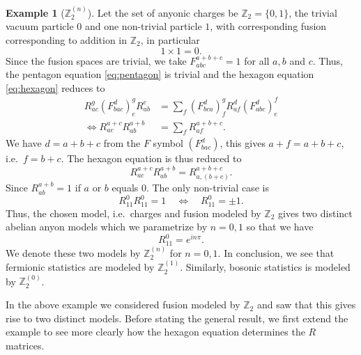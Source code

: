 \documentclass[a4paper,10pt,oneside]{book}
\theoremstyle{plain}
\theoremstyle{definition}
\newtheorem{example}{Example}[section]
\theoremstyle{remark}
\begin{document}
\begin{example}[$\mathbb{Z}_2^{(n)}$]
  Let the set of anyonic charges be $\mathbb{Z}_2 = \{0, 1\}$, the trivial vacuum particle $0$ and one non-trivial particle $1$, with corresponding fusion corresponding to addition in $\mathbb{Z}_2$, in particular
  \begin{equation}
    1 × 1 = 0.
  \end{equation}
  Since the fusion spaces are trivial, we take $F_{abc}^{a+b+c} = 1$ for all $a, b$ and $c$. Thus, the pentagon equation \cref{eq:pentagon} is trivial and the hexagon equation \cref{eq:hexagon} reduces to
  \begin{equation}
    \begin{aligned}
      R_{ac}^g \left(F_{bac}^d\right)^g_e R_{ab}^e &= \sum_{f} \left(F_{bca}^d\right)^g_f R_{af}^d \left(F_{abc}^d\right)^f_e \\
      \iff
      R_{ac}^{a+c} R_{ab}^{a+b} &= \sum_{f} R_{af}^{a+b+c}.
    \end{aligned}
  \end{equation}
  We have $d = a + b + c$ from the $F$ symbol $\left(F_{bac}^d\right)$, this gives $a + f = a + b + c$, i.e.\ $f = b + c$. The hexagon equation is thus reduced to
  \begin{equation}
    R_{ac}^{a+c} R_{ab}^{a+b} = R_{a,(b+c)}^{a+b+c}.
  \end{equation}
  Since $R_{ab}^{a+b} = 1$ if $a$ or $b$ equals $0$. The only non-trivial case is
  \begin{equation}
    R_{11}^{0} R_{11}^{0} = 1 \quad \iff \quad R_{11}^{0} = ±1.
  \end{equation}
  Thus, the chosen model, i.e.\ charges and fusion modeled by $\mathbb{Z}_2$ gives two distinct abelian anyon models which we parametrize by $n = 0, 1$ so that we have
  \begin{equation}
    R_{11}^0 = e^{inπ}.
  \end{equation}
  We denote these two models by $\mathbb{Z}_2^{(n)}$ for $n = 0, 1$. In conclusion, we see that fermionic statistics are modeled by $\mathbb{Z}_2^{(1)}$. Similarly, bosonic statistics is modeled by $\mathbb{Z}_2^{(0)}$.
\end{example}

In the above example we considered fusion modeled by $\mathbb{Z}_2$ and saw that this gives rise to two distinct models. Before stating the general result, we first extend the example to see more clearly how the hexagon equation determines the $R$ matrices.
\end{document}
